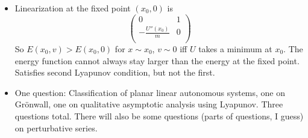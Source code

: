 \documentclass[../notes.tex]{subfiles}
\begin{document}
\begin{itemize}
\begin{itemize}
        \item Linearization at the fixed point $(x_0,0)$ is
        \begin{equation*}
            \begin{pmatrix}
                0 & 1\\
                -\frac{U''(x_0)}{m} & 0\\
            \end{pmatrix}
        \end{equation*}
        So $E(x_0,v)>E(x_0,0)$ for $x\sim x_0$, $v\sim 0$ iff $U$ takes a minimum at $x_0$. The energy function cannot always stay larger than the energy at the fixed point. Satisfies second Lyapunov condition, but not the first.
        \item One question: Classification of planar linear autonomous systems, one on Gr\"{o}nwall, one on qualitative asymptotic analysis using Lyapunov. Three questions total. There will also be some questions (parts of questions, I guess) on perturbative series.
    \end{itemize}
\end{itemize}
\end{document}
